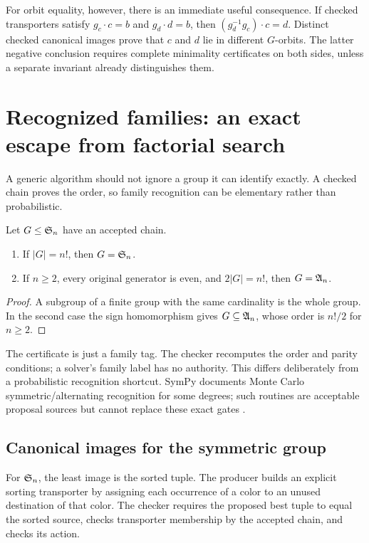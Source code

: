 For orbit equality, however, there is an immediate useful consequence. If checked transporters satisfy $g_c\cdot c=b$ and $g_d\cdot d=b$, then $(g_d^{-1}g_c)\cdot c=d$. Distinct checked canonical images prove that $c$ and $d$ lie in different $G$-orbits. The latter negative conclusion requires complete minimality certificates on both sides, unless a separate invariant already distinguishes them.

\section{Recognized families: an exact escape from factorial search}
\label{sec:families}
A generic algorithm should not ignore a group it can identify exactly. A checked chain proves the order, so family recognition can be elementary rather than probabilistic.

\begin{proposition}
Let $G\leq\mathfrak S_n$ have an accepted chain.
\begin{enumerate}
\item If $|G|=n!$, then $G=\mathfrak S_n$.
\item If $n\geq2$, every original generator is even, and $2|G|=n!$, then $G=\mathfrak A_n$.
\end{enumerate}
\end{proposition}
\begin{proof}
A subgroup of a finite group with the same cardinality is the whole group. In the second case the sign homomorphism gives $G\subseteq\mathfrak A_n$, whose order is $n!/2$ for $n\geq2$.
\end{proof}

The certificate is just a family tag. The checker recomputes the order and parity conditions; a solver's family label has no authority. This differs deliberately from a probabilistic recognition shortcut. SymPy documents Monte Carlo symmetric/alternating recognition for some degrees; such routines are acceptable proposal sources but cannot replace these exact gates \cite{sympy}.

\subsection{Canonical images for the symmetric group}
For $\mathfrak S_n$, the least image is the sorted tuple. The producer builds an explicit sorting transporter by assigning each occurrence of a color to an unused destination of that color. The checker requires the proposed best tuple to equal the sorted source, checks transporter membership by the accepted chain, and checks its action.


